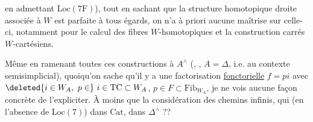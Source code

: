 en admettant $\mathrm{Loc}(7\mathrm{F})$), tout en sachant que la structure homotopique droite associée à $W$ est parfaite à tous égards, on n'a à priori aucune maîtrise sur celle-ci, notamment pour le calcul des fibres $W$-homotopiques et la construction  carrés $W$-cartésiens.

Même en ramenant toutes ces constructions à $A^{\wedge}$ (, , $A=\mathbb{\Delta}$, \deleted{\unsure{)}} i.e.  au contexte semisimplicial), quoiqu'on sache qu'il y a une factorisation \uline{fonctorielle} $f=pi$ avec $\deleted{i\in W_A,\ p\in}\ i\in \mathrm{TC}\subset W_A$, $p\in F\subset\mathrm{Fib}_{W_A}$, je ne vois aucune façon concrète de l'expliciter.
À moins que la considération des chemins infinis, qui (en l'absence de $\mathrm{Loc}(7)$)   dans $\mathrm{Cat}$,   dans $\mathbb{\Delta}^{\wedge}$ ??


